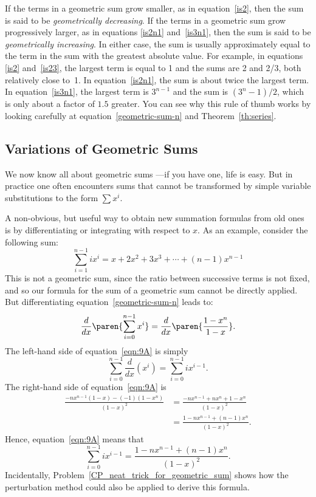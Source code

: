 If the terms in a geometric sum grow smaller, as in
equation~\ref{is2}, then the sum is said to be \emph{geometrically
  decreasing}.  If the terms in a geometric sum grow progressively
larger, as in equations \ref{is2n1} and~\ref{is3n1}, then the sum is
said to be \emph{geometrically increasing}.  In either case, the sum
is usually approximately equal to the term in the sum with the
greatest absolute value.  For example, in equations \ref{is2}
and~\ref{is23}, the largest term is equal to 1 and the sums are 2 and
2/3, both relatively close to~1.  In equation~\ref{is2n1}, the sum is
about twice the largest term.  In equation~\ref{is3n1}, the largest
term is $3^{n-1}$ and the sum is $(3^n-1)/2$, which is only about a
factor of $1.5$ greater.  You can see why this rule of thumb works by
looking carefully at equation~\ref{geometric-sum-n} and
Theorem~\ref{th:series}.

\subsection{Variations of Geometric Sums}\label{variant_sum_sec}

We now know all about geometric sums ---if you have one, life is easy.
But in practice one often encounters sums that cannot be transformed
by simple variable substitutions to the form $\sum x^i$.

A non-obvious, but useful way to obtain new summation formulas from
old ones is by differentiating or integrating with respect to $x$.  As
an example, consider the following sum:
\[
\sum_{i=1}^{n-1} i x^i = x + 2 x^2 + 3 x^3 + \cdots + (n - 1) x^{n -
  1}
\]
This is not a geometric sum, since the ratio between successive terms
is not fixed, and so our formula for the sum of a geometric sum cannot
be directly applied.  But differentiating
equation~\ref{geometric-sum-n} leads
to:
\begin{equation}\label{eqn:9A}
\frac{d}{dx} \paren{ \sum_{i = 0}^{n - 1} x^i }
   = \frac{d}{dx} \paren{ \frac{1 - x^n}{1 - x} }.
\end{equation}
The left-hand side of equation~\ref{eqn:9A} is simply
\[
\sum_{i = 0}^{n - 1} \frac{d}{dx} (x^i)
    = \sum_{i = 0}^{n - 1} i x^{i - 1}.
\]
The right-hand side of equation~\ref{eqn:9A} is
\begin{align*}
\frac{ -n x^{n - 1} (1 - x) - (-1) (1 - x^n) }{ (1 - x)^2 }
    &= \frac{ -n x^{n - 1} + n x^n + 1 - x^n }{ (1 - x)^2 } \\
    &= \frac{1 - n x^{n - 1} + (n - 1) x^n}{ (1 - x)^2 }.
\end{align*}
Hence, equation~\ref{eqn:9A} means that
\[
\sum_{i = 0}^{n - 1} i x^{i - 1}
    = \frac{1 - n x^{n - 1} + (n - 1) x^n}{ (1 - x)^2 }.
\]
Incidentally, Problem~\ref{CP_neat_trick_for_geometric_sum} shows how
the perturbation method could also be applied to derive this formula.

